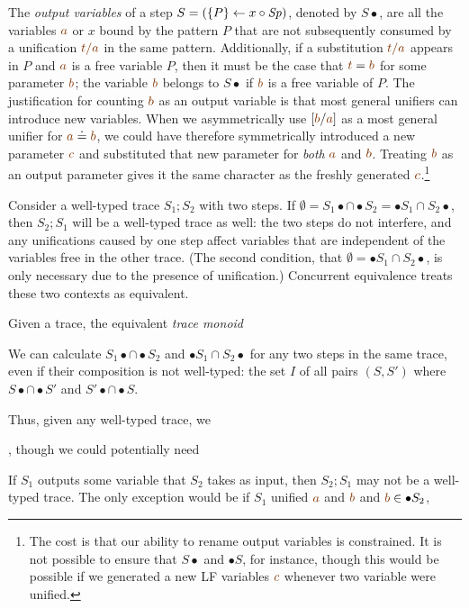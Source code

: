 The {\it output variables} of a step $S = (\{{P}\} \leftarrow {x} \circ {{\it Sp}})$,
denoted by $S{\bullet}$, are all the variables $\lf{a}$ or $x$ bound
by the pattern $P$ that are not subsequently consumed by a unification
$\lf{t/a}$ in the same pattern. Additionally, if a substitution
$\lf{t/a}$ appears in $P$ and $\lf{a}$ is a free variable $P$, then it
must be the case that $\lf{t} = \lf{b}$ for some parameter $\lf{b}$;
the variable $\lf{b}$ belongs to $S{\bullet}$ if $\lf{b}$ is a free
variable of $P$. The justification for counting $\lf{b}$ as an output
variable is that most general unifiers can introduce new variables.
When we asymmetrically use $[\lf{b}/\lf{a}]$ as a most general unifier
for $\lf{a} \doteq \lf{b}$, we could have therefore symmetrically
introduced a new parameter $\lf{c}$ and substituted that new parameter
for {\it both} $\lf{a}$ and $\lf{b}$. Treating $\lf{b}$ as an output
parameter gives it the same character as the freshly generated
$\lf{c}$.\footnote{The cost is that our ability to rename output
  variables is constrained. It is not possible to ensure that
  $S{\bullet}$ and ${\bullet}S$, for instance, though this would be
  possible if we generated a new LF variables $\lf{c}$ whenever two
  variable were unified.}

Consider a well-typed trace $S_1; S_2$ with two steps. If $\emptyset =
S_1{\bullet} \cap {\bullet}S_2 = {\bullet}S_1 \cap S_2{\bullet}$, then
$S_2; S_1$ will be a well-typed trace as well: the two steps do not
interfere, and any unifications caused by one step affect variables
that are independent of the variables free in the other trace. (The
second condition, that $\emptyset = {\bullet}S_1 \cap S_2{\bullet}$,
is only necessary due to the presence of unification.) Concurrent
equivalence treats these two contexts as equivalent.

Given a trace, the equivalent {\it trace monoid} 

We can calculate 
$S_1{\bullet} \cap {\bullet}S_2$ and ${\bullet}S_1 \cap S_2{\bullet}$ 
for any two steps in the same trace, even if their composition is 
not well-typed: the set $I$ of all pairs $(S, S')$ where 
$S{\bullet} \cap {\bullet}S'$ and $S'{\bullet} \cap {\bullet}S$.

Thus, given any well-typed trace, we 

, though we could
potentially need

If $S_1$
outputs some variable that $S_2$ takes as input, then $S_2; S_1$ may
not be a well-typed trace. The only exception would be if $S_1$
unified $\lf{a}$ and $\lf{b}$ and $\lf{b} \in {\bullet}S_2$, 


